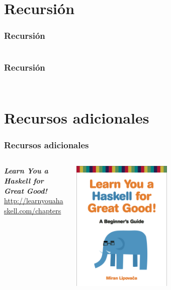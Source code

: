 \section{Recursión}
\begin{frame}[fragile]
  \frametitle{Recursión}
  {\color{white}
    \inputminted[bgcolor=bg]{haskell}{code/recursion01.hs}
  }
\end{frame}

\begin{frame}[fragile]
  \frametitle{Recursión}
  {\color{white}
    \inputminted[bgcolor=bg]{haskell}{code/recursion02.hs}
  }
  {\color{white}
    \inputminted[bgcolor=bg]{haskell}{code/recursion02.hs}
  }
\end{frame}

\section{Recursos adicionales}
\begin{frame}
  \frametitle{Recursos adicionales}
  \begin{columns}
    \begin{column}{0.5\textwidth}
      \textbf{\textit{Learn You a Haskell for Great Good!}}\\
      \url{http://learnyouahaskell.com/chapters}
    \end{column}
    \begin{column}{0.5\textwidth}  %
      \begin{center}
        \includegraphics[width=0.5\textwidth]{img/LYH.png}
      \end{center}
    \end{column}
  \end{columns}
\end{frame}
